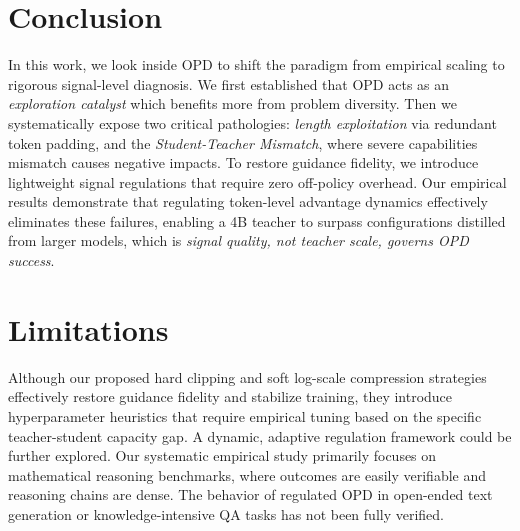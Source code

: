 \documentclass[11pt]{article}
\begin{document}
\section{Conclusion}
\label{sec:conclusion}

In this work, we look inside OPD to shift the paradigm from empirical scaling to rigorous signal-level diagnosis. 
We first established that OPD acts as an \emph{exploration catalyst} which benefits more from problem diversity.
Then we systematically expose two critical pathologies: \emph{length exploitation} via redundant token padding, and the \emph{Student-Teacher Mismatch}, where severe capabilities mismatch causes negative impacts. 
To restore guidance fidelity, we introduce lightweight signal regulations that require zero off-policy overhead. Our empirical results demonstrate that regulating token-level advantage dynamics effectively eliminates these failures, enabling a 4B teacher to surpass configurations distilled from larger models,  which is \textit{signal quality, not teacher scale, governs OPD success}.


\section*{Limitations}
Although our proposed hard clipping and soft log-scale compression strategies effectively restore guidance fidelity and stabilize training, they introduce hyperparameter heuristics that require empirical tuning based on the specific teacher-student capacity gap. A dynamic, adaptive regulation framework could be further explored.
Our systematic empirical study primarily focuses on mathematical reasoning benchmarks, where outcomes are easily verifiable and reasoning chains are dense. 
The behavior of regulated OPD in open-ended text generation or knowledge-intensive QA tasks has not been fully verified.
\end{document}
